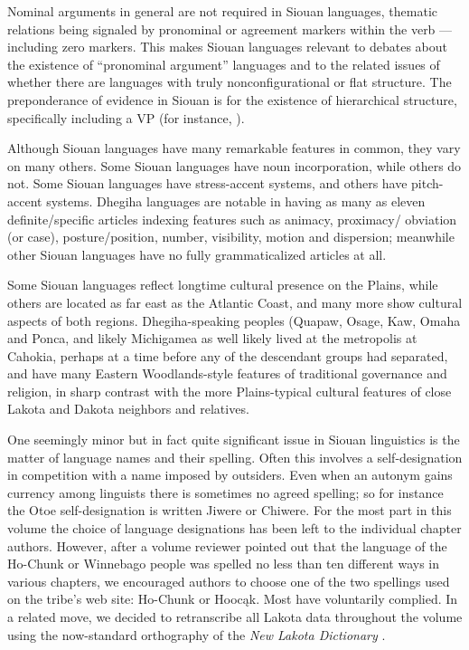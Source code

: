 \begin{refsection}
Nominal arguments in general are not required in Siouan languages, thematic relations being signaled by pronominal or agreement markers within the verb --- including zero markers. This makes Siouan languages relevant to debates about the existence of ``pronominal argument'' languages \citep{Jelinek1984} and to the related issues of whether there are languages with truly nonconfigurational or flat structure. The preponderance of evidence in Siouan is for the existence of hierarchical structure, specifically including a VP (for instance, \citealt{West2003,Johnson2016, JohnsonEtAl2016, Rosen2016}).


Although Siouan languages have many remarkable features in common, they vary on many others.  Some Siouan languages have noun incorporation, while others do not. Some Siouan languages have stress-accent systems, and others have pitch-accent systems. Dhegiha languages are notable in having as many as eleven definite/specific articles indexing features such as animacy, proximacy/ obviation (or case), posture/position, number, visibility, motion and dispersion; meanwhile other Siouan languages have no fully grammaticalized articles at all.


Some Siouan languages reflect longtime cultural presence on the Plains, while others are located as far east as the Atlantic Coast, and many more show cultural aspects of both regions. Dhegiha-speaking peoples (Quapaw, Osage, Kaw, Omaha and Ponca, and likely Michigamea as well \citep{Kasak2016,Koontz1995a} likely lived at the metropolis at Cahokia, perhaps at a time before any of the descendant groups had separated, and have many Eastern Woodlands-style features of traditional governance and religion, in sharp contrast with the more Plains-typical cultural features of close Lakota and Dakota neighbors and relatives.

One seemingly minor but in fact quite significant issue in Siouan linguistics is the matter of language names and their spelling. Often this involves a self-designation in competition with a name imposed by outsiders. Even when an autonym gains currency among linguists there is sometimes no agreed spelling; so for instance the Otoe self-designation is written Jiwere or Chiwere. For the most part in this volume the choice of language designations has been left to the individual chapter authors. However, after a volume reviewer pointed out that the language of the Ho-Chunk or Winnebago people was spelled no less than ten different ways in various chapters, we encouraged authors to choose one of the two spellings used on the tribe's web site:  Ho-Chunk or Hooc\k{a}k.  Most have voluntarily complied.  In a related move, we decided to retranscribe all Lakota data throughout the volume using the now-standard orthography of the \textit{New Lakota Dictionary} \citep{Ullrich2012}.


\end{refsection}
